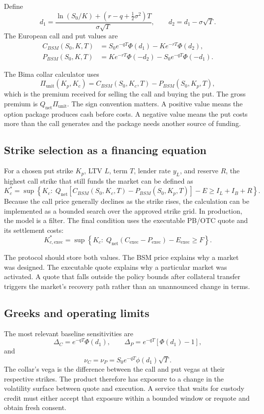 \documentclass[11pt,oneside]{article}
\newcommand{\PhiN}{\Phi}
\newcommand{\phiN}{\phi}
\begin{document}
Define
\[
d_1=\frac{\ln(S_0/K)+(r-q+\tfrac12\sigma^2)T}{\sigma\sqrt{T}},
\qquad
d_2=d_1-\sigma\sqrt{T}.
\]
The European call and put values are
\begin{align}
C_{BSM}(S_0,K,T)&=S_0e^{-qT}\PhiN(d_1)-Ke^{-rT}\PhiN(d_2),\\
P_{BSM}(S_0,K,T)&=Ke^{-rT}\PhiN(-d_2)-S_0e^{-qT}\PhiN(-d_1).
\end{align}

The Bima collar calculator uses
\[
\Pi_{\mathrm{unit}}(K_p,K_c)=C_{BSM}(S_0,K_c,T)-P_{BSM}(S_0,K_p,T),
\]
which is the premium received for selling the call and buying the put. The gross premium is $Q_{\mathrm{net}}\Pi_{\mathrm{unit}}$. The sign convention matters. A positive value means the option package produces cash before costs. A negative value means the put costs more than the call generates and the package needs another source of funding.

\subsection{Strike selection as a financing equation}

For a chosen put strike $K_p$, LTV $L$, term $T$, lender rate $y_L$, and reserve $R$, the highest call strike that still funds the market can be defined as
\[
K_c^*=\sup\left\{K_c:\;Q_{\mathrm{net}}\left[C_{BSM}(S_0,K_c,T)-P_{BSM}(S_0,K_p,T)\right]-E\geq I_L+I_B+R\right\}.
\]
Because the call price generally declines as the strike rises, the calculation can be implemented as a bounded search over the approved strike grid. In production, the model is a filter. The final condition uses the executable PB/OTC quote and its settlement costs:
\[
K_{c,\mathrm{exec}}^*=\sup\left\{K_c:\;Q_{\mathrm{net}}(C_{\mathrm{exec}}-P_{\mathrm{exec}})-E_{\mathrm{exec}}\geq F\right\}.
\]

The protocol should store both values. The BSM price explains why a market was designed. The executable quote explains why a particular market was activated. A quote that falls outside the policy bounds after collateral transfer triggers the market's recovery path rather than an unannounced change in terms.

\subsection{Greeks and operating limits}

The most relevant baseline sensitivities are
\[
\Delta_C=e^{-qT}\PhiN(d_1),
\qquad
\Delta_P=e^{-qT}\left[\PhiN(d_1)-1\right],
\]
and
\[
\nu_C=\nu_P=S_0e^{-qT}\phiN(d_1)\sqrt{T}.
\]
The collar's vega is the difference between the call and put vegas at their respective strikes. The product therefore has exposure to a change in the volatility surface between quote and execution. A service that waits for custody credit must either accept that exposure within a bounded window or requote and obtain fresh consent.
\end{document}

